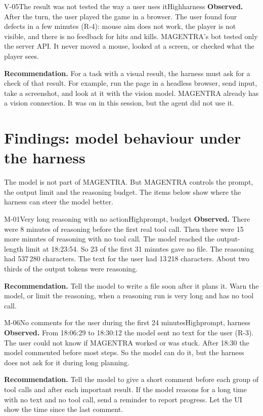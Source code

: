 \documentclass[11pt,a4paper]{article}
\begin{document}
\begin{findingbox}{V-05}{The result was not tested the way a user uses it}{High}{harness}
\textbf{Observed.} After the turn, the user played the game in a browser. The
user found four defects in a few minutes (R-4): mouse aim does not work, the
player is not visible, and there is no feedback for hits and kills. MAGENTRA's
bot tested only the server API. It never moved a mouse, looked at a screen, or
checked what the player sees.

\textbf{Recommendation.} For a task with a visual result, the harness must ask
for a check of that result. For example, run the page in a headless browser,
send input, take a screenshot, and look at it with the vision model. MAGENTRA
already has a vision connection. It was on in this session, but the agent did
not use it.
\end{findingbox}

\section{Findings: model behaviour under the harness}

The model is not part of MAGENTRA. But MAGENTRA controls the prompt, the output
limit and the reasoning budget. The items below show where the harness can steer
the model better.

\begin{findingbox}{M-01}{Very long reasoning with no action}{High}{prompt, budget}
\textbf{Observed.} There were 8 minutes of reasoning before the first real tool
call. Then there were 15 more minutes of reasoning with no tool call. The model
reached the output-length limit at 18:23:54. So 23 of the first 31 minutes gave
no file. The reasoning had 537\,280 characters. The text for the user had
13\,218 characters. About two thirds of the output tokens were reasoning.

\textbf{Recommendation.} Tell the model to write a file soon after it plans it.
Warn the model, or limit the reasoning, when a reasoning run is very long and has
no tool call.
\end{findingbox}

\begin{findingbox}{M-06}{No comments for the user during the first 24 minutes}{High}{prompt, harness}
\textbf{Observed.} From 18:06:29 to 18:30:12 the model sent no text for the
user (R-3). The user could not know if MAGENTRA worked or was stuck. After
18:30 the model commented before most steps. So the model can do it, but the
harness does not ask for it during long planning.

\textbf{Recommendation.} Tell the model to give a short comment before each
group of tool calls and after each important result. If the model reasons for a
long time with no text and no tool call, send a reminder to report progress. Let
the UI show the time since the last comment.
\end{findingbox}
\end{document}
